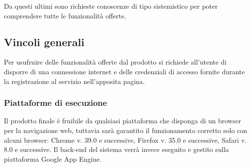 Da questi ultimi sono richieste conoscenze di tipo sistemistico per poter comprendere tutte le funzionalità offerte.

\subsection{Vincoli generali}
Per usufruire delle funzionalità offerte dal prodotto si richiede all'utente di disporre
di una connessione internet e delle credenziali di accesso fornite durante la registrazione al servizio nell'apposita pagina.

\subsubsection{Piattaforme di esecuzione}
Il prodotto finale è fruibile da qualsiasi piattaforma che disponga di un browser per la navigazione web, tuttavia sarà garantito il funzionamento corretto solo con alcuni browser: Chrome v. 39.0 e successive, Firefox v. 35.0 e successive, Safari v. 8.0 e successive.
Il back-end del sistema verrà invece eseguito e gestito sulla piattaforma Google App Engine.